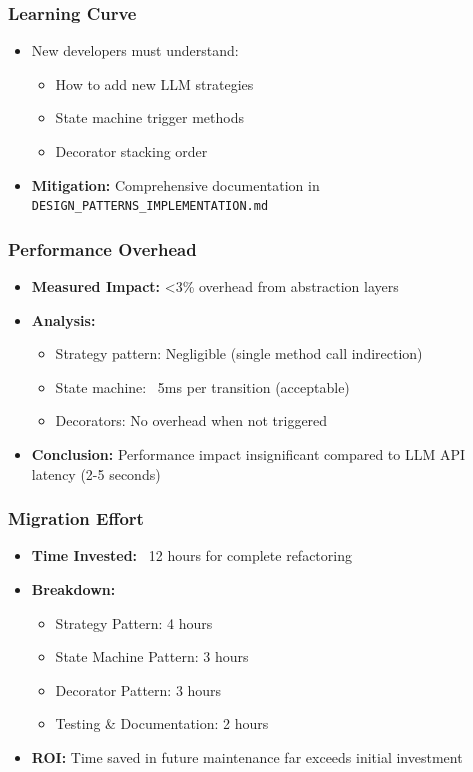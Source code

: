 \documentclass[11pt,a4paper]{article}
\begin{document}
\subsubsection{Learning Curve}

\begin{itemize}
    \item New developers must understand:
    \begin{itemize}
        \item How to add new LLM strategies
        \item State machine trigger methods
        \item Decorator stacking order
    \end{itemize}
    \item \textbf{Mitigation:} Comprehensive documentation in \texttt{DESIGN\_PATTERNS\_IMPLEMENTATION.md}
\end{itemize}

\subsubsection{Performance Overhead}

\begin{itemize}
    \item \textbf{Measured Impact:} <3\% overhead from abstraction layers
    \item \textbf{Analysis:}
    \begin{itemize}
        \item Strategy pattern: Negligible (single method call indirection)
        \item State machine: ~5ms per transition (acceptable)
        \item Decorators: No overhead when not triggered
    \end{itemize}
    \item \textbf{Conclusion:} Performance impact insignificant compared to LLM API latency (2-5 seconds)
\end{itemize}

\subsubsection{Migration Effort}

\begin{itemize}
    \item \textbf{Time Invested:} ~12 hours for complete refactoring
    \item \textbf{Breakdown:}
    \begin{itemize}
        \item Strategy Pattern: 4 hours
        \item State Machine Pattern: 3 hours
        \item Decorator Pattern: 3 hours
        \item Testing \& Documentation: 2 hours
    \end{itemize}
    \item \textbf{ROI:} Time saved in future maintenance far exceeds initial investment
\end{itemize}
\end{document}
